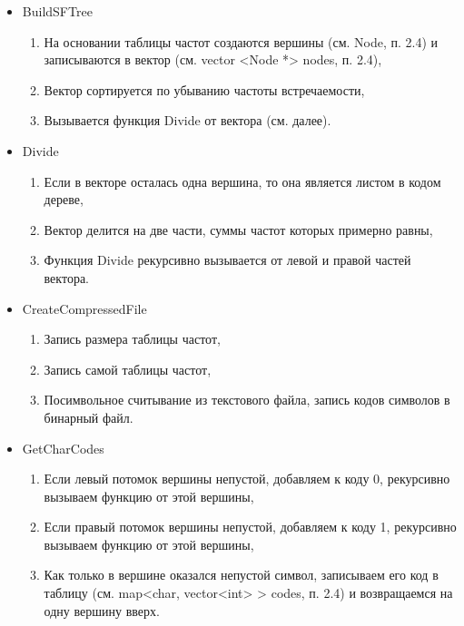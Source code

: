 \documentclass[a4paper,12pt]{article} %
\begin{document}
\begin{itemize}
\begin{enumerate}
        \end{enumerate}
        \item BuildSFTree
        \begin{enumerate}
        \item
        На основании таблицы частот создаются вершины (см. Node, 
        п. 2.4) и записываются в вектор (см. vector <Node *> 
        nodes, п. 2.4),
        \item
        Вектор сортируется по убыванию частоты встречаемости,
        \item
        Вызывается функция Divide от вектора (см. далее).
        \end{enumerate}
        \item Divide
        \begin{enumerate}
            \item
            Если в векторе осталась одна вершина, то она является листом в кодом дереве,
            \item
            Вектор делится на две части, суммы частот которых примерно равны,
            \item
            Функция Divide рекурсивно вызывается от левой и правой  частей вектора.
        \end{enumerate}
        \item CreateCompressedFile
        \begin{enumerate}
        \item
        Запись размера таблицы частот,
        \item
        Запись самой таблицы частот,
        \item
        Посимвольное считывание из текстового файла, запись кодов символов
        в бинарный файл.
        \end{enumerate}
        \item GetCharCodes
        \begin{enumerate}
            \item
            Если левый потомок вершины непустой, добавляем к коду 0,
            рекурсивно вызываем функцию от этой вершины,
            \item
            Если правый потомок вершины непустой, добавляем к коду 1,
            рекурсивно вызываем функцию от этой вершины,
            \item
            Как только в вершине оказался непустой символ, записываем его код в таблицу (см. map<char, vector<int> > 
            codes, п. 2.4) и возвращаемся на одну вершину вверх.
        \end{enumerate}

\end{itemize}
\end{document}

